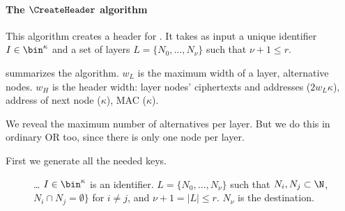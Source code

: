 \paragraph*{The \(\CreateHeader\) algorithm}


This algorithm creates a header for .
It takes as input a unique identifier \(I\in \bin^\kappa\) and a set of layers 
\(L = \{N_0, \dotsc, N_\nu\}\) such that \(\nu+1\leq r\).

 summarizes the algorithm.
\(w_L\) is the maximum width of a layer, \ie alternative nodes.
\(w_H\) is the header width:
layer nodes' ciphertexts and addresses ($2w_L\kappa$),
address of next node ($\kappa$),
\ac{MAC} ($\kappa$).

We reveal the maximum number of alternatives per layer.
But we do this in ordinary \ac{OR} too, since there is only one node per layer.

First we generate all the needed keys.

\begin{figure*}
  \caption{\label{fig:CreateHeader}%
    \dots
      $I\in \bin^\kappa$ is an identifier.
      $L = \{N_0, \dotsc, N_\nu\}$ such that $N_i, N_j\subset \N$, $N_i\cap N_j 
      = \emptyset\}$ for $i\neq j$, and $\nu+1 = |L| \leq r$.
      $N_\nu$ is the destination.
  }
\end{figure*}

